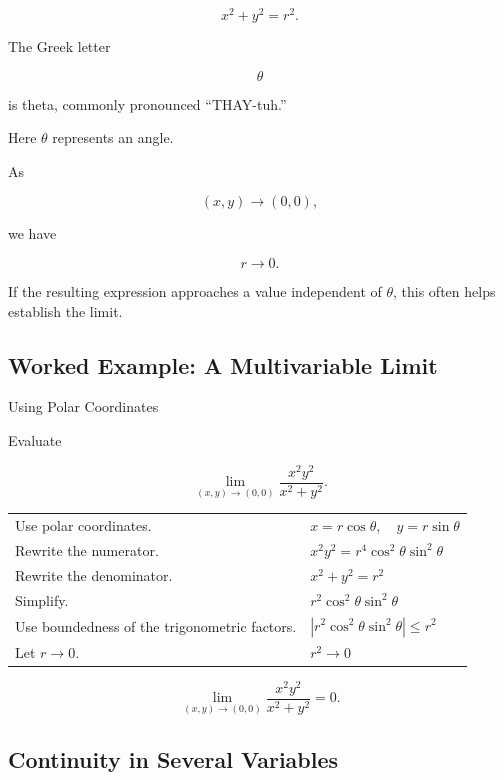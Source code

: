 \[ x^2+y^2=r^2. \]

The Greek letter

\[ \theta \]

is theta, commonly pronounced ``THAY-tuh.''

Here \(\theta\) represents an angle.

As

\[ (x,y)\to(0,0), \]

we have

\[ r\to0. \]

If the resulting expression approaches a value independent of \(\theta\),
this often helps establish the limit.

\subsection{Worked Example: A Multivariable Limit}
\label{subsec:worked-multivariable-limit}

\begin{workedexamplebox}{Using Polar Coordinates}

Evaluate

\[ \lim_{(x,y)\to(0,0)}
\frac{x^2y^2}{x^2+y^2}. \]

\begin{tabularx}{\textwidth}{@{}>{\raggedright\arraybackslash}p{}X@{}}
Use polar coordinates. &
\(x=r\cos\theta,\quad y=r\sin\theta\)\\
Rewrite the numerator. &
\(x^2y^2=r^4\cos^2\theta\sin^2\theta\)\\
Rewrite the denominator. &
\(x^2+y^2=r^2\)\\
Simplify. &
\(r^2\cos^2\theta\sin^2\theta\)\\
Use boundedness of the trigonometric factors. &
\(\left|r^2\cos^2\theta\sin^2\theta\right|\leq r^2\)\\
Let \(r\to0\). &
\(r^2\to0\)
\end{tabularx}

\begin{answerbox}
\[ \boxed{\lim_{(x,y)\to(0,0)}
\frac{x^2y^2}{x^2+y^2}=0.} \]
\end{answerbox}
\end{workedexamplebox}

\subsection{Continuity in Several Variables}
\label{subsec:multivariable-continuity}

